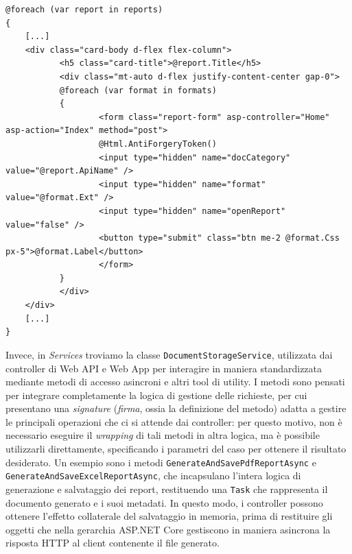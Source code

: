 \begin{itemize}
        \begin{lstlisting}[language={[Sharp]C}]
@foreach (var report in reports)
{
    [...]
    <div class="card-body d-flex flex-column">
           <h5 class="card-title">@report.Title</h5>
           <div class="mt-auto d-flex justify-content-center gap-0">
           @foreach (var format in formats)
           {
                   <form class="report-form" asp-controller="Home" asp-action="Index" method="post">
                   @Html.AntiForgeryToken()
                   <input type="hidden" name="docCategory" value="@report.ApiName" />
                   <input type="hidden" name="format" value="@format.Ext" />
                   <input type="hidden" name="openReport" value="false" />
                   <button type="submit" class="btn me-2 @format.Css px-5">@format.Label</button>
                   </form>
           }
           </div>
    </div>
    [...]
}
\end{lstlisting}
\end{itemize}

Invece, in \emph{Services} troviamo la classe \texttt{DocumentStorageService}, utilizzata dai controller di Web API e Web App per interagire in maniera standardizzata mediante metodi di accesso asincroni e altri tool di utility. I metodi sono pensati per integrare completamente la logica di gestione delle richieste, per cui presentano una \emph{signature} (\emph{firma}, ossia la definizione del metodo) adatta a gestire le principali operazioni che ci si attende dai controller: per questo motivo, non è necessario eseguire il \emph{wrapping} di tali metodi in altra logica, ma è possibile utilizzarli direttamente, specificando i parametri del caso per ottenere il risultato desiderato.
Un esempio sono i metodi \texttt{GenerateAndSavePdfReportAsync} e \texttt{GenerateAndSaveExcelReportAsync}, che incapsulano l'intera logica di generazione e salvataggio dei report, restituendo una \texttt{Task} che rappresenta il documento generato e i suoi metadati. In questo modo, i controller possono ottenere l'effetto collaterale del salvataggio in memoria, prima di restituire gli oggetti che nella gerarchia ASP.NET Core gestiscono in maniera asincrona la risposta HTTP al client contenente il file generato.

